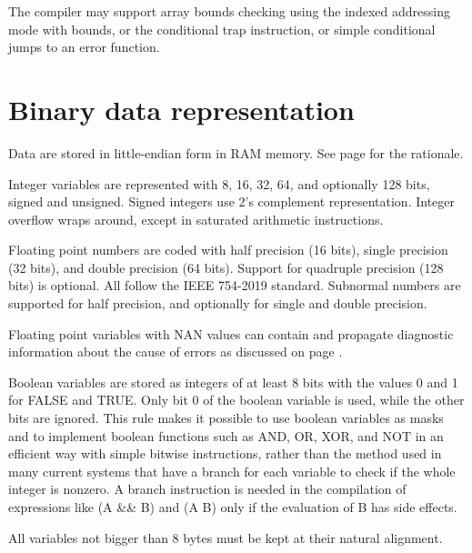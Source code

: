 \documentclass[forwardcom.tex]{subfiles}
\begin{document}
\vspace{2mm}
The compiler may support array bounds checking using the indexed addressing mode with bounds, or the conditional trap instruction, or simple conditional jumps to an error function. 

\section{Binary data representation} \label{binaryDataRepresentation}
Data are stored in little-endian form in RAM memory. See page \pageref{endianness} for the rationale. 
\vspace{2mm}

Integer variables are represented with 8, 16, 32, 64, and optionally 128 bits, signed and unsigned. Signed integers use 2's complement representation. Integer overflow wraps around, except in saturated arithmetic instructions. 
\vspace{2mm}

Floating point numbers are coded with half precision (16 bits), single precision (32 bits), and double precision (64 bits). Support for quadruple precision (128 bits) is optional. All follow the IEEE 754-2019 standard. Subnormal numbers are supported for half precision, and optionally for single and double precision.
\vspace{2mm}

Floating point variables with NAN values can contain and propagate diagnostic information about the cause of errors as discussed on page \pageref{nanPropagation}. 
\vspace{2mm}

Boolean variables are stored as integers of at least 8 bits with the values 0 and 1 for FALSE and TRUE. Only bit 0 of the boolean variable is used, while the other bits are ignored. This rule makes it possible to use boolean variables as masks and to implement boolean functions such as AND, OR, XOR, and NOT in an efficient way with simple bitwise instructions, rather than the method used in many current systems that have a branch for each variable to check if the whole integer is nonzero. A branch instruction is needed in the compilation of expressions like (A \&\& B) and (A \textbar\textbar{} B) only if the evaluation of B has side effects. 
\vspace{2mm}

All variables not bigger than 8 bytes must be kept at their natural alignment.
\vspace{2mm}
\end{document}
